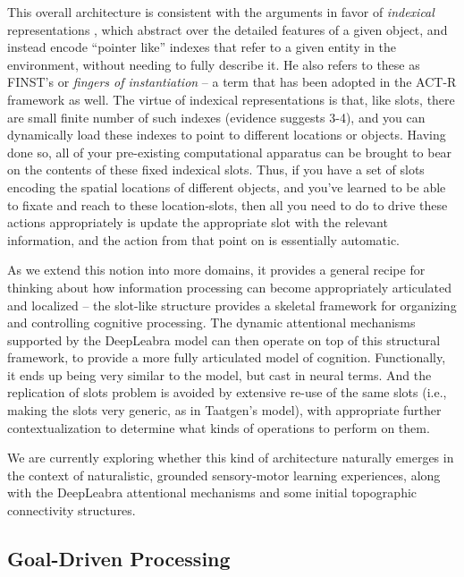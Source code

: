 \documentclass[11pt,twoside]{article}
\newif\myifpdf
\begin{document}
This overall architecture is consistent with the arguments in favor of {\em indexical} representations \cite{Pylyshyn00}, which abstract over the detailed features of a given object, and instead encode ``pointer like'' indexes that refer to a given entity in the environment, without needing to fully describe it.  He also refers to these as FINST's or {\em fingers of instantiation} -- a term that has been adopted in the ACT-R framework as well.  The virtue of indexical representations is that, like slots, there are small finite number of such indexes (evidence suggests 3-4), and you can dynamically load these indexes to point to different locations or objects.  Having done so, all of your pre-existing computational apparatus can be brought to bear on the contents of these fixed indexical slots.  Thus, if you have a set of slots encoding the spatial locations of different objects, and you've learned to be able to fixate and reach to these location-slots, then all you need to do to drive these actions appropriately is update the appropriate slot with the relevant information, and the action from that point on is essentially automatic.

As we extend this notion into more domains, it provides a general recipe for thinking about how information processing can become appropriately articulated and localized -- the slot-like structure provides a skeletal framework for organizing and controlling cognitive processing.  The dynamic attentional mechanisms supported by the DeepLeabra model can then operate on top of this structural framework, to provide a more fully articulated model of cognition.  Functionally, it ends up being very similar to the  model, but cast in neural terms.  And the replication of slots problem is avoided by extensive re-use of the same slots (i.e., making the slots very generic, as in Taatgen's model), with appropriate further contextualization to determine what kinds of operations to perform on them.

We are currently exploring whether this kind of architecture naturally emerges in the context of naturalistic, grounded sensory-motor learning experiences, along with the DeepLeabra attentional mechanisms and some initial topographic connectivity structures.

\subsection{Goal-Driven Processing}
\end{document}
